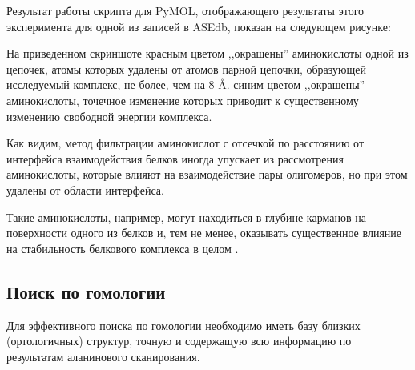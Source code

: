 Результат работы скрипта для PyMOL, отображающего результаты этого эксперимента для одной из записей в ASEdb, показан на следующем рисунке: 


На приведенном скриншоте красным цветом ,,окрашены'' аминокислоты одной из цепочек, атомы которых удалены от атомов парной цепочки, образующей исследуемый комплекс, не более, чем на 8 \AA{}. синим цветом ,,окрашены'' аминокислоты, точечное изменение которых приводит к существенному изменению свободной энергии комплекса. 

Как видим, метод фильтрации аминокислот с отсечкой по расстоянию от интерфейса взаимодействия белков иногда упускает из рассмотрения аминокислоты, которые влияют на взаимодействие пары олигомеров, но при этом удалены от области интерфейса.

Такие аминокислоты, например, могут находиться в глубине карманов на поверхности одного из белков и, тем не менее, оказывать существенное влияние на стабильность белкового комплекса в целом \cite{pockets2004}.

\newpage
\subsection{Поиск по гомологии}

Для эффективного поиска по гомологии необходимо иметь базу близких (ортологичных) структур, точную и содержащую всю информацию по результатам аланинового сканирования.

